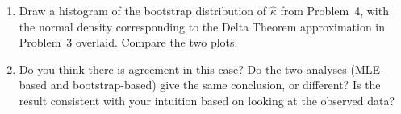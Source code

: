 \documentclass[a4paper,12pt]{article}
\begin{document}
\begin{enumerate}
\item Draw a histogram of the bootstrap distribution of $\hat\kappa$ from Problem~4, with the normal density corresponding to the Delta Theorem approximation in Problem~3 overlaid.  Compare the two plots.  

\item Do you think there is agreement in this case?  Do the two analyses (MLE-based and bootstrap-based) give the same conclusion, or different?  Is the result consistent with your intuition based on looking at the observed data?

\end{enumerate}
\end{document}
